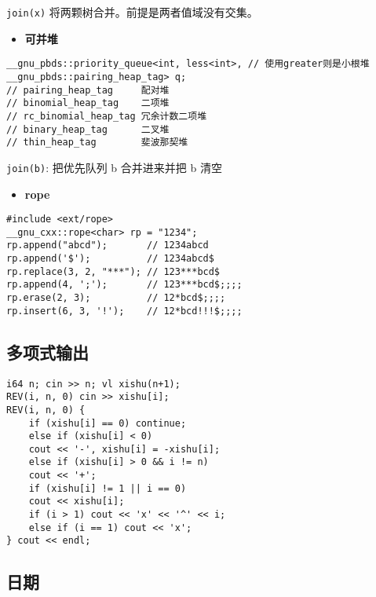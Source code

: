 \documentclass[a4paper,landscape,twocolumn]{ctexart}
\newcommand{\point}[1]{
	\begin{itemize}
		\item \textbf{#1}
	\end{itemize}
}
\begin{document}
\texttt{join(x)} 将两颗树合并。前提是两者值域没有交集。

\point{可并堆}

\begin{lstlisting}
__gnu_pbds::priority_queue<int, less<int>, // 使用greater则是小根堆
__gnu_pbds::pairing_heap_tag> q;
// pairing_heap_tag     配对堆
// binomial_heap_tag    二项堆
// rc_binomial_heap_tag 冗余计数二项堆
// binary_heap_tag      二叉堆
// thin_heap_tag        斐波那契堆
\end{lstlisting}

\texttt{join(b)}: 把优先队列 b 合并进来并把 b 清空

\point{rope}

\begin{lstlisting}
#include <ext/rope>
__gnu_cxx::rope<char> rp = "1234";
rp.append("abcd");       // 1234abcd
rp.append('$');          // 1234abcd$
rp.replace(3, 2, "***"); // 123***bcd$
rp.append(4, ';');       // 123***bcd$;;;;
rp.erase(2, 3);          // 12*bcd$;;;;
rp.insert(6, 3, '!');    // 12*bcd!!!$;;;;
\end{lstlisting}

\subsection{多项式输出}

\begin{lstlisting}
i64 n; cin >> n; vl xishu(n+1);
REV(i, n, 0) cin >> xishu[i];
REV(i, n, 0) {
	if (xishu[i] == 0) continue;
	else if (xishu[i] < 0)
	cout << '-', xishu[i] = -xishu[i];
	else if (xishu[i] > 0 && i != n)
	cout << '+';
	if (xishu[i] != 1 || i == 0)
	cout << xishu[i];
	if (i > 1) cout << 'x' << '^' << i;
	else if (i == 1) cout << 'x';
} cout << endl;
\end{lstlisting}

\subsection{日期}
\end{document}

